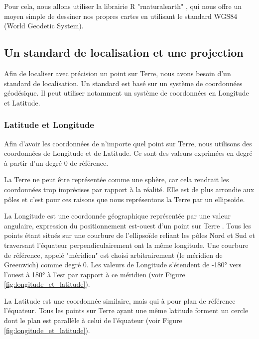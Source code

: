 \documentclass{article}
\begin{document}
Pour cela, nous allons utiliser la librairie R "rnaturalearth" \cite{rnaturalearth}, qui nous offre un moyen simple de dessiner nos propres cartes en utilisant le standard WGS84 (World Geodetic System).

\subsection{Un standard de localisation et une projection}

Afin de localiser avec précision un point sur Terre, nous avons besoin d'un standard de localisation. Un standard est basé sur un système de coordonnées géodésique. Il peut utiliser notamment un système de coordonnées en Longitude et Latitude.

\subsubsection{Latitude et Longitude}

Afin d'avoir les coordonnées de n'importe quel point sur Terre, nous utilisons des coordonnées de Longitude et de Latitude. Ce sont des valeurs exprimées en degré à partir d'un degré 0 de référence.

La Terre ne peut être représentée comme une sphère, car cela rendrait les coordonnées trop imprécises par rapport à la réalité. Elle est de plus arrondie aux pôles et c'est pour ces raisons que nous représentons la Terre par un ellipsoïde. 

La Longitude est une coordonnée géographique représentée par une valeur angulaire, expression du positionnement est-ouest d'un point sur Terre \cite{frwiki:188614923}. Tous les points étant situés sur une courbure de l'ellipsoïde reliant les pôles Nord et Sud et traversant l'équateur perpendiculairement ont la même longitude. Une courbure de référence, appelé "méridien" est choisi arbitrairement (le méridien de Greenwich) comme degré 0. Les valeurs de Longitude s'étendent de -180° vers l'ouest à 180° à l'est par rapport à ce méridien (voir Figure \ref{fig:longitude_et_latitude}). 

La Latitude est une coordonnée similaire, mais qui à pour plan de référence l'équateur. Tous les points sur Terre ayant une même latitude forment un cercle dont le plan est parallèle à celui de l'équateur \cite{frwiki:189341688} (voir Figure \ref{fig:longitude_et_latitude}). 
\end{document}
